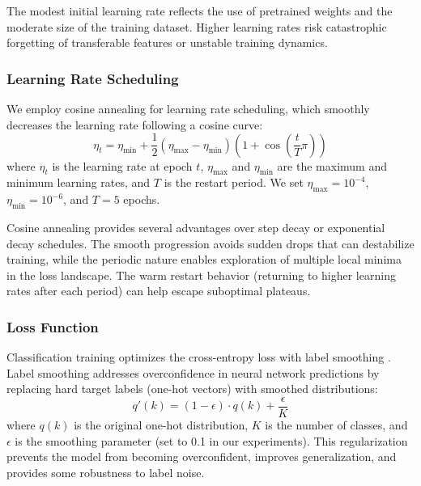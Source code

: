 \documentclass[11pt,a4paper]{article}
\begin{document}
The modest initial learning rate reflects the use of pretrained weights and the moderate size of the training dataset. Higher learning rates risk catastrophic forgetting of transferable features or unstable training dynamics.

\subsubsection{Learning Rate Scheduling}

We employ cosine annealing \citep{loshchilov2017sgdr} for learning rate scheduling, which smoothly decreases the learning rate following a cosine curve:
\begin{equation}
    \eta_t = \eta_{\text{min}} + \frac{1}{2}(\eta_{\text{max}} - \eta_{\text{min}})\left(1 + \cos\left(\frac{t}{T}\pi\right)\right)
\end{equation}
where $\eta_t$ is the learning rate at epoch $t$, $\eta_{\text{max}}$ and $\eta_{\text{min}}$ are the maximum and minimum learning rates, and $T$ is the restart period. We set $\eta_{\text{max}} = 10^{-4}$, $\eta_{\text{min}} = 10^{-6}$, and $T = 5$ epochs.

Cosine annealing provides several advantages over step decay or exponential decay schedules. The smooth progression avoids sudden drops that can destabilize training, while the periodic nature enables exploration of multiple local minima in the loss landscape. The warm restart behavior (returning to higher learning rates after each period) can help escape suboptimal plateaus.

\subsubsection{Loss Function}

Classification training optimizes the cross-entropy loss with label smoothing \citep{szegedy2016rethinking}. Label smoothing addresses overconfidence in neural network predictions by replacing hard target labels (one-hot vectors) with smoothed distributions:
\begin{equation}
    q'(k) = (1 - \epsilon) \cdot q(k) + \frac{\epsilon}{K}
\end{equation}
where $q(k)$ is the original one-hot distribution, $K$ is the number of classes, and $\epsilon$ is the smoothing parameter (set to 0.1 in our experiments). This regularization prevents the model from becoming overconfident, improves generalization, and provides some robustness to label noise.
\end{document}
